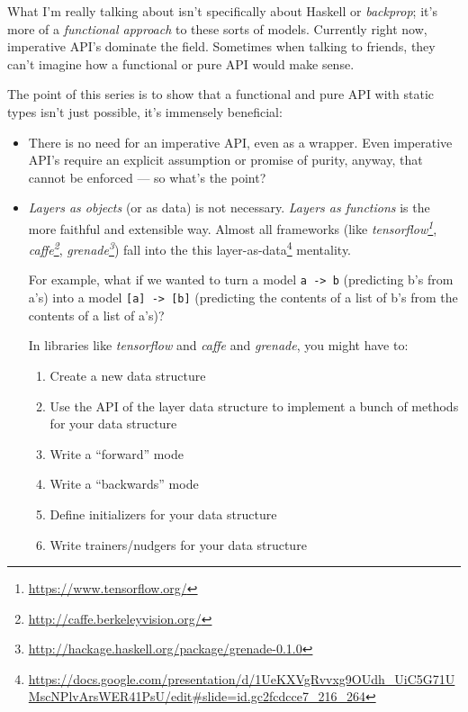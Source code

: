 \documentclass[]{article}
\renewcommand{\href}[2]{#2\footnote{\url{#1}}}
\begin{document}
What I'm really talking about isn't specifically about Haskell or
\emph{backprop}; it's more of a \emph{functional approach} to these sorts of
models. Currently right now, imperative API's dominate the field. Sometimes when
talking to friends, they can't imagine how a functional or pure API would make
sense.

The point of this series is to show that a functional and pure API with static
types isn't just possible, it's immensely beneficial:

\begin{itemize}
\item
  There is no need for an imperative API, even as a wrapper. Even imperative
  API's require an explicit assumption or promise of purity, anyway, that cannot
  be enforced --- so what's the point?
\item
  \emph{Layers as objects} (or as data) is not necessary. \emph{Layers as
  functions} is the more faithful and extensible way. Almost all frameworks
  (like \emph{\href{https://www.tensorflow.org/}{tensorflow}},
  \emph{\href{http://caffe.berkeleyvision.org/}{caffe}},
  \emph{\href{http://hackage.haskell.org/package/grenade-0.1.0}{grenade}}) fall
  into the this
  \href{https://docs.google.com/presentation/d/1UeKXVgRvvxg9OUdh_UiC5G71UMscNPlvArsWER41PsU/edit\#slide=id.gc2fcdcce7_216_264}{layer-as-data}
  mentality.

  For example, what if we wanted to turn a model \texttt{a\ -\textgreater{}\ b}
  (predicting b's from a's) into a model
  \texttt{{[}a{]}\ -\textgreater{}\ {[}b{]}} (predicting the contents of a list
  of b's from the contents of a list of a's)?

  In libraries like \emph{tensorflow} and \emph{caffe} and \emph{grenade}, you
  might have to:

  \begin{enumerate}
  \def\labelenumi{\arabic{enumi}.}
  \tightlist
  \item
    Create a new data structure
  \item
    Use the API of the layer data structure to implement a bunch of methods for
    your data structure
  \item
    Write a ``forward'' mode
  \item
    Write a ``backwards'' mode
  \item
    Define initializers for your data structure
  \item
    Write trainers/nudgers for your data structure
  \end{enumerate}


\end{itemize}
\end{document}
